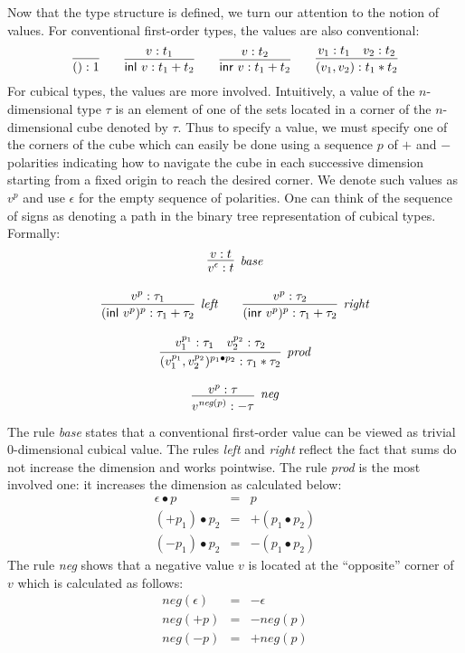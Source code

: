 \documentclass[authoryear,preprint]{sigplanconf}
\newcommand{\negp}[1]{\textit{neg}(#1)}
\newcommand{\inl}[1]{\textsf{inl}~#1}
\newcommand{\inr}[1]{\textsf{inr}~#1}
\begin{document}
Now that the type structure is defined, we turn our attention to the notion
of values. For conventional first-order types, the values are also
conventional:
\[
\infer{() : 1}{} 
\qquad
\infer{\inl{v} : t_1 + t_2}{v : t_1}
\qquad
\infer{\inr{v} : t_1 + t_2}{v : t_2}
\qquad
\infer{(v_1,v_2) : t_1 * t_2}{v_1 : t_1 & v_2 : t_2}
\]
For cubical types, the values are more involved. Intuitively, a value of the
$n$-dimensional type $\tau$ is an element of one of the sets located in a
corner of the $n$-dimensional cube denoted by $\tau$. Thus to specify a
value, we must specify one of the corners of the cube which can easily be
done using a sequence $p$ of $+$ and $-$ polarities indicating how to
navigate the cube in each successive dimension starting from a fixed origin
to reach the desired corner. We denote such values as $v^{p}$ and use
$\epsilon$ for the empty sequence of polarities. One can think of the
sequence of signs as denoting a path in the binary tree representation of
cubical types. Formally:
\[\begin{array}{c}
\infer[\textit{base}]{v^{\epsilon} : t}{v : t} \\
\\
\infer[\textit{left}]{(\inl{v^p})^{p} : \tau_1 + \tau_2}{v^{p} : \tau_1}
\qquad
\infer[\textit{right}]{(\inr{v^p})^{p} : \tau_1 + \tau_2}{v^{p} : \tau_2} \\
\\
\infer[\textit{prod}]{(v_1^{p_1},v_2^{p_2})^{p_1 \bullet p_2} : \tau_1 * \tau_2}
      {v_1^{p_1} : \tau_1 & v_2^{p_2} : \tau_2} \\
\\
\infer[\textit{neg}]{v^{\negp{p}} : - \tau}{v^p : \tau} 
\end{array}\]
The rule \textit{base} states that a conventional first-order value can be
viewed as trivial 0-dimensional cubical value. The rules \textit{left} and
\textit{right} reflect the fact that sums do not increase the dimension and
works pointwise. The rule \textit{prod} is the most involved one: it
increases the dimension as calculated below:
\[\begin{array}{rcl}
\epsilon \bullet p &=& p \\
(+p_1) \bullet p_2 &=& + (p_1 \bullet p_2) \\
(-p_1) \bullet p_2 &=& - (p_1 \bullet p_2) 
\end{array}\]
The rule \textit{neg} shows that a negative value $v$ is located at the
``opposite'' corner of $v$ which is calculated as follows:
\[\begin{array}{rcl}
\negp{\epsilon} &=& -\epsilon \\
\negp{+p} &=& -\negp{p} \\
\negp{-p} &=& +\negp{p}
\end{array}\]
\end{document}
